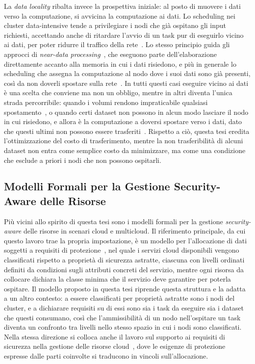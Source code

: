 La \emph{data locality} ribalta invece la prospettiva iniziale: al posto di muovere i dati verso la computazione, si avvicina la computazione ai dati. Lo scheduling nei cluster data-intensive tende a privilegiare i nodi che già ospitano gli input richiesti, accettando anche di ritardare l'avvio di un task pur di eseguirlo vicino ai dati, per poter ridurre il traffico della rete~\cite{delay-scheduling, data-locality-investigation-mapreduce}. Lo stesso principio guida gli approcci di \emph{near-data processing}~\cite{beyond-the-wall-ndp}, che eseguono parte dell'elaborazione direttamente accanto alla memoria in cui i dati risiedono, e più in generale lo scheduling che assegna la computazione al nodo dove i suoi dati sono già presenti, così da non doverli spostare sulla rete~\cite{transfer-cost-aware-edge-scheduling}. In tutti questi casi eseguire vicino ai dati è una scelta che conviene ma non un obbligo, mentre in altri diventa l'unica strada percorribile: quando i volumi rendono impraticabile qualsiasi spostamento~\cite{bringing-computation-moea}, o quando certi dataset non possono in alcun modo lasciare il nodo in cui risiedono, e allora è la computazione a doversi spostare verso i dati, dato che questi ultimi non possono essere trasferiti~\cite{paradigm-non-transferable-dataset}. Rispetto a ciò, questa tesi eredita l'ottimizzazione del costo di trasferimento, mentre la non trasferibilità di alcuni dataset non entra come semplice costo da minimizzare, ma come una condizione che esclude a priori i nodi che non possono ospitarli. 


\subsection{Modelli Formali per la Gestione Security-Aware delle Risorse}
\label{subsec:modelli_formali_correlati}

Più vicini allo spirito di questa tesi sono i modelli formali per la gestione \emph{security-aware} delle risorse in scenari cloud e multicloud. Il riferimento principale, da cui questo lavoro trae la propria impostazione, è un modello per l'allocazione di dati soggetti a requisiti di protezione~\cite{sec-aware-data-alloc-multicloud}, nel quale i servizi cloud disponibili vengono classificati rispetto a proprietà di sicurezza astratte, ciascuna con livelli ordinati definiti da condizioni sugli attributi concreti del servizio, mentre ogni risorsa da collocare dichiara la classe minima che il servizio deve garantire per poterla ospitare. Il modello proposto in questa tesi riprende questa struttura e la adatta a un altro contesto: a essere classificati per proprietà astratte sono i nodi del cluster, e a dichiarare requisiti su di essi sono sia i task da eseguire sia i dataset che questi consumano, così che l'ammissibilità di un nodo nell'ospitare un task diventa un confronto tra livelli nello stesso spazio in cui i nodi sono classificati. Nella stessa direzione si colloca anche il lavoro sul supporto ai requisiti di sicurezza nella gestione delle risorse cloud~\cite{supp-sec-req-res-management-cloud}, dove le esigenze di protezione espresse dalle parti coinvolte si traducono in vincoli sull'allocazione. 


